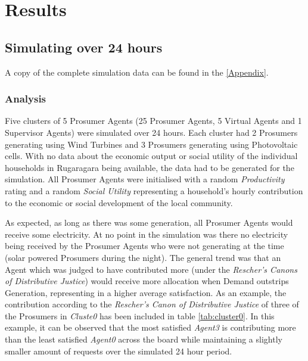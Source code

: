 \chapter{Results}
\label{Results}

\section*{Simulating over 24 hours}
A copy of the complete simulation data can be found in the \ref{Appendix}.

\subsection*{Analysis}
Five clusters of 5 Prosumer Agents (25 Prosumer Agents, 5 Virtual Agents and 1 Supervisor Agents) were simulated over 24 hours. Each cluster had 2 Prosumers generating using Wind Turbines and 3 Prosumers generating using Photovoltaic cells. With no data about the economic output or social utility of the individual households in Rugaragara being available, the data had to be generated for the simulation. All Prosumer Agents were initialised with a random \textit{Productivity} rating and a random \textit{Social Utility} representing a household's hourly contribution to the economic or social development of the local community.

As expected, as long as there was some generation, all Prosumer Agents would receive some electricity. At no point in the simulation was there no electricity being received by the Prosumer Agents who were not generating at the time (solar powered Prosumers during the night). The general trend was that an Agent which was judged to have contributed more (under the \textit{Rescher's Canons of Distributive Justice}) would receive more allocation when Demand outstrips Generation, representing in a higher average satisfaction. As an example, the contribution according to the \textit{Rescher's Canon of Distributive Justice} of three of the Prosumers in \textit{Cluste0} has been included in table \ref{tab:cluster0}. In this example, it can be observed that the most satisfied \textit{Agent3} is contributing more than the least satisfied \textit{Agent0} across the board while maintaining a slightly smaller amount of requests over the simulated 24 hour period. 

